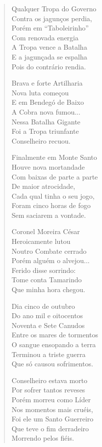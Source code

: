 \begin{verse}
Qualquer Tropa do Governo \\
Contra os jagunços perdia, \\
Porém em ``Taboleirinho'' \\
Com renovada energia \\
A Tropa vence a Batalha \\
E a jagunçada se espalha \\
Pois do contrário rendia. 

Brava e forte Artilharia \\
Nova luta começou \\
E em Bendegó de Baixo \\
A Cobra nova fumou...\\
Nessa Batalha Gigante \\
Foi a Tropa triunfante \\
Conselheiro recuou. 

Finalmente em Monte Santo \\
Houve nova mortandade \\
Com baixas de parte a parte \\
De maior atrocidade, \\
Cada qual tinha o seu jogo, \\
Foram cinco horas de fogo \\
Sem saciarem a vontade. 
\pagebreak

Coronel Moreira César \\
Heroicamente lutou \\
Noutro Combate cerrado \\
Porém alguém o alvejou... \\
Ferido disse sorrindo: \\
Tome conta Tamarindo \\
Que minha hora chegou. 

Dia cinco de outubro \\
Do ano mil e oitocentos \\
Noventa e Sete Canudos \\
Entre os mares de tormentos \\
O sangue ensopando a terra \\
Terminou a triste guerra \\
Que só causou sofrimentos. 

Conselheiro estava morto \\
Por sofrer tantos reveses \\
Porém morreu como Líder \\
Nos momentos mais cruéis, \\
Foi ele um Santo Guerreiro \\
Que teve o fim derradeiro \\
Morrendo pelos fiéis. 


\end{verse}
